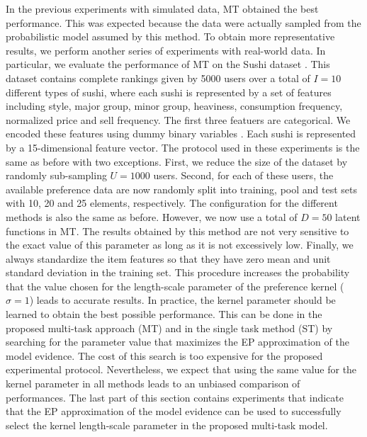 In the previous experiments with simulated data, MT obtained the best performance. This was expected because the data were actually sampled
from the probabilistic model assumed by this method. To obtain more representative results, we perform another series of experiments
with real-world data. In particular, we evaluate the performance of MT on the Sushi dataset \citep{kamishima2003}.
This dataset contains complete rankings given by 5000 users over a total of $I = 10$ different types of sushi,
where each sushi is represented by a set of features including style, major group, minor group, heaviness, consumption
frequency, normalized price and sell frequency. The first three featuers are categorical. We encoded these
features using dummy binary variables \citep{bonilla2010}. 
Each sushi is represented by a 15-dimensional feature vector. The protocol used in these experiments is
the same as before with two exceptions. First, we reduce the size of the dataset by
randomly sub-sampling $U=1000$ users. Second, for each of these users, the available preference data are 
now randomly split into training, pool and test sets with 10, 20 and 25 elements, respectively.
The configuration for the different methods is also the same as before.
However, we now use a total of $D=50$ latent functions in MT. 
The results obtained by this method are not very sensitive to the exact value of this parameter as long as it is not excessively low.
Finally, we always standardize the item features so that they have zero mean and unit standard deviation in the training set.
This procedure increases the probability that the value chosen for the length-scale parameter of the
preference kernel ($\sigma = 1$) leads to accurate results. 
In practice, the kernel parameter should be learned to obtain the best possible performance. 
This can be done in the proposed multi-task approach (MT) and in the single task method (ST) by searching for the parameter value that
maximizes the EP approximation of the model evidence. The cost of this search is too expensive for the proposed experimental protocol.
Nevertheless, we expect that using the same value for the kernel parameter in all methods leads to an unbiased comparison of performances.
The last part of this section contains experiments that indicate that the EP approximation of the model evidence can be used to successfully
select the kernel length-scale parameter in the proposed multi-task model.

